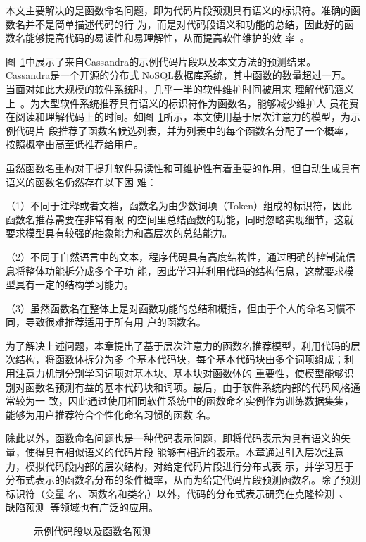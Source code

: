 本文主要解决的是函数命名问题，即为代码片段预测具有语义的标识符。准确的函数名并不是简单描述代码的行
为，而是对代码段语义和功能的总结，因此好的函数名能够提高代码的易读性和易理解性，从而提高软件维护的效
率~\cite{takang1996effects}。

图~\ref{stop}中展示了来自Cassandra的示例代码片段以及本文方法的预测结果。Cassandra是一个开源的分布式
NoSQL数据库系统，其中函数的数量超过一万。当面对如此大规模的软件系统时，几乎一半的软件维护时间被用来
理解代码涵义上~\cite{corbi1989program}。为大型软件系统推荐具有语义的标识符作为函数名，能够减少维护人
员花费在阅读和理解代码上的时间。如图~\ref{stop}所示，本文使用基于层次注意力的模型，为示例代码片
段推荐了函数名候选列表，并为列表中的每个函数名分配了一个概率，按照概率由高至低推荐给用户。

虽然函数名重构对于提升软件易读性和可维护性有着重要的作用，但自动生成具有语义的函数名仍然存在以下困
难：

（1）不同于注释或者文档，函数名为由少数词项（Token）组成的标识符，因此函数名推荐需要在非常有限
的空间里总结函数的功能，同时忽略实现细节，这就要求模型具有较强的抽象能力和高层次的总结能力。

（2）不同于自然语言中的文本，程序代码具有高度结构性，通过明确的控制流信息将整体功能拆分成多个子功
能，因此学习并利用代码的结构信息，这就要求模型具有一定的结构学习能力。

（3）虽然函数名在整体上是对函数功能的总结和概括，但由于个人的命名习惯不同，导致很难推荐适用于所有用
户的函数名。

为了解决上述问题，本章提出了基于层次注意力的函数名推荐模型，利用代码的层次结构，将函数体拆分为多
个基本代码块，每个基本代码块由多个词项组成；利用注意力机制分别学习词项对基本块、基本块对函数体的
重要性，使模型能够识别对函数名预测有益的基本代码块和词项。最后，由于软件系统内部的代码风格通常较为一
致，因此通过使用相同软件系统中的函数命名实例作为训练数据集集，能够为用户推荐符合个性化命名习惯的函数
名。

除此以外，函数命名问题也是一种代码表示问题，即将代码表示为具有语义的矢量，使得具有相似语义的代码片段
能够有相近的表示。本章通过引入层次注意力，模拟代码段内部的层次结构，对给定代码片段进行分布式表
示，并学习基于分布式表示的函数名分布的条件概率，从而为给定代码片段预测函数名。除了预测标识符（变量
名、函数名和类名）以外，代码的分布式表示研究在克隆检测~\cite{white2016deep,allamanis2018learning}、
缺陷预测~\cite{murali2017finding}等领域也有广泛的应用。

\begin{figure}
\centering
{}
\hfill
{}
\caption{示例代码段以及函数名预测}
\label{stop}
\end{figure}

